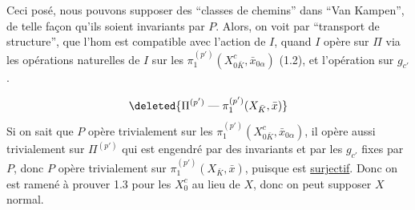 
Ceci posé, nous pouvons supposer  des ``classes de chemins'' dans  ``Van Kampen'',   de telle façon qu'ils soient invariants par $P$.  Alors, on voit par ``transport de structure'', que  l'hom
est compatible avec l'action de $I$, quand $I$ opère sur $\Pi$ via les opérations naturelles de $I$ sur les $\pi_1^{(p')}(X^c_{0\bar K},\bar x_{0\alpha})$ (1.2), et l'opération \uline{} sur  $g_{c'}$.

\[
\deleted{\Pi^{(p')}\mathrel{\text{---}}\pi_1^{(p')}(X_{\bar K},\bar x)}
\]
Si on sait que $P$ opère trivialement sur les $\pi_1^{(p')}(X^c_{0\bar K},\bar x_{0\alpha})$, il opère aussi trivialement sur $\Pi^{(p')}$ qui est engendré par des invariants et par les $g_{c'}$ fixes  par $P$, donc $P$ opère trivialement sur  $\pi_1^{(p')}(X_{\bar K},\bar x)$, puisque  est \uline{surjectif}. Donc on est ramené  à prouver 1.3 pour les $X_0^c$ au lieu de $X$, donc on peut supposer $X$   normal.
